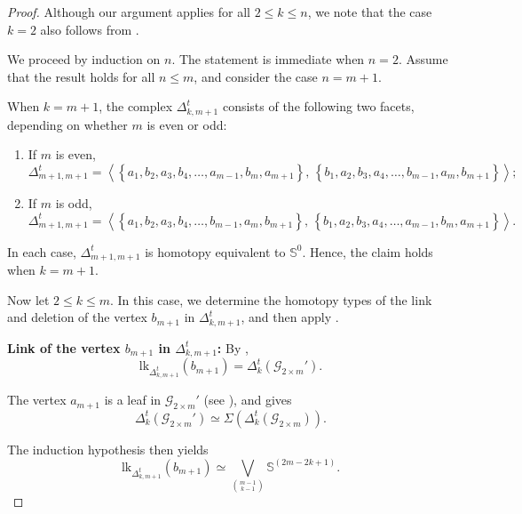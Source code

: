 \documentclass[11pt,reqno,a4paper]{amsart}
\theoremstyle{definition}
\theoremstyle{theorem}
\newcommand{\totalkcut}{\Delta_{k}^t}
\newcommand{\lno}{\left(}
\newcommand{\rno}{\right)}
\newcommand{\lcu}{\left\{}
\newcommand{\rcu}{\right\}}
\newcommand{\bbS}{\mathbb{S}}
\newcommand{\lk}{\mathrm{lk}}
\theoremstyle{remark}
\begin{document}
\begin{proof}
    Although our argument applies for all $2 \le k \le n$, we note that the case $k=2$ also follows from \cite[Theorem~4.16]{bayer2024total}. 
    
    We proceed by induction on $n$. The statement is immediate when $n=2$. 
    Assume that the result holds for all $n \le m$, and consider the case $n=m+1$. 
    
    When $k=m+1$, the complex $\Delta_{k,m+1}^t$ consists of the following two facets, depending on whether $m$ is even or odd:
    \begin{enumerate}
        \item If $m$ is even,
        \[
        \Delta_{m+1,m+1}^t = \left\langle
            \lcu a_1, b_2, a_3, b_4,\dots, a_{m-1}, b_m, a_{m+1} \rcu,\,
            \lcu b_1, a_2, b_3, a_4,\dots, b_{m-1}, a_m, b_{m+1} \rcu
        \right\rangle;
        \]

        \item If $m$ is odd,
        \[
        \Delta_{m+1,m+1}^t = \left\langle
            \lcu a_1, b_2, a_3, b_4,\dots, b_{m-1}, a_m, b_{m+1} \rcu,\,
            \lcu b_1, a_2, b_3, a_4,\dots, a_{m-1}, b_m, a_{m+1} \rcu
        \right\rangle.
        \]
    \end{enumerate}
    
    In each case, $\Delta_{m+1,m+1}^t$ is homotopy equivalent to $\bbS^{0}$. Hence, the claim holds when $k=m+1$.

    Now let $2 \le k \le m$. 
    In this case, we determine the homotopy types of the link and deletion of the vertex $b_{m+1}$ in $\Delta_{k,m+1}^t$, and then apply .
    
    \medskip
    
    \noindent\textbf{Link of the vertex $b_{m+1}$ in $\Delta_{k,m+1}^t$:}
    By ,
    \[
    \lk_{\Delta_{k,m+1}^t}\lno b_{m+1}\rno 
        = \totalkcut\lno \mathcal{G}_{2\times m}' \rno.
    \]
    
    The vertex $a_{m+1}$ is a leaf in $\mathcal{G}_{2\times m}'$ 
    (see ), and 
     gives
    \[
    \totalkcut\lno \mathcal{G}_{2\times m}' \rno 
        \simeq 
        \Sigma\!\left( \totalkcut\lno \mathcal{G}_{2\times m} \rno \right).
    \]
    
    The induction hypothesis then yields
    \begin{equation}\label{link of b_n+1}
        \lk_{\Delta_{k,m+1}^t}\lno b_{m+1}\rno 
        \simeq 
        \bigvee_{\binom{m-1}{k-1}} \bbS^{\lno 2m-2k+1\rno}.
\end{equation}



\end{proof}
\end{document}
